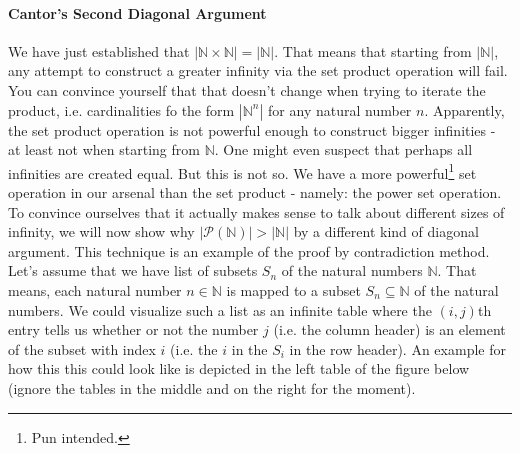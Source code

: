 \paragraph{Cantor's Second Diagonal Argument} We have just established that $|\mathbb{N} \times \mathbb{N}| = |\mathbb{N}|$. That means that starting from $|\mathbb{N}|$, any attempt to construct a greater infinity via the set product operation will fail. You can convince yourself that that doesn't change when trying to iterate the product, i.e. cardinalities fo the form $|\mathbb{N}^n|$ for any natural number $n$. Apparently, the set product operation is not powerful enough to construct bigger infinities - at least not when starting from $\mathbb{N}$. One might even suspect that perhaps all infinities are created equal. But this is not so. We have a more powerful\footnote{Pun intended.} set operation in our arsenal than the set product - namely: the power set operation. To convince ourselves that it actually makes sense to talk about different sizes of infinity, we will now show why $|\mathcal{P}(\mathbb{N})| > |\mathbb{N}|$ by a different kind of diagonal argument. This technique is an example of the proof by contradiction method. Let's assume that we have list of subsets $S_n$ of the natural numbers $\mathbb{N}$. That means, each natural number $n \in \mathbb{N}$ is mapped to a subset $S_n \subseteq \mathbb{N}$ of the natural numbers. We could visualize such a list as an infinite table where the $(i,j)$th entry tells us whether or not the number $j$ (i.e. the column header) is an element of the subset with index $i$ (i.e. the $i$ in the $S_i$ in the row header). An example for how this this could look like is depicted in the left table of the figure below (ignore the tables in the middle and on the right for the moment).

